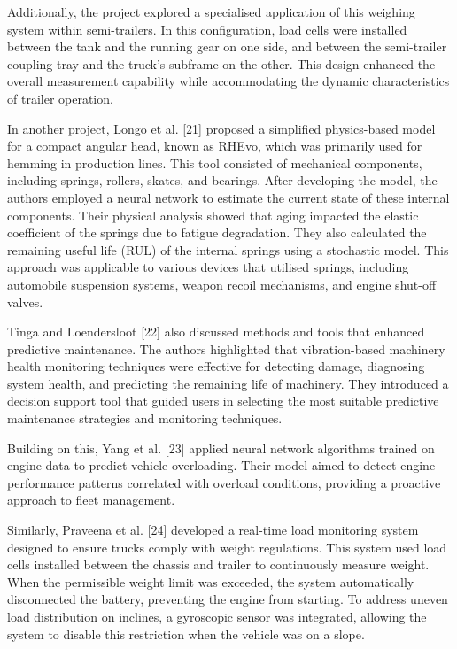 Additionally, the project explored a specialised application of this weighing system within semi-trailers. In this configuration, load cells were installed between the tank and the running gear on one side, and between the semi-trailer coupling tray and the truck's subframe on the other. This design enhanced the overall measurement capability while accommodating the dynamic characteristics of trailer operation.

In another project, Longo et al. [21] proposed a simplified physics-based model for a compact angular head, known as RHEvo, which was primarily used for hemming in production lines. This tool consisted of mechanical components, including springs, rollers, skates, and bearings. After developing the model, the authors employed a neural network to estimate the current state of these internal components. Their physical analysis showed that aging impacted the elastic coefficient of the springs due to fatigue degradation. They also calculated the remaining useful life (RUL) of the internal springs using a stochastic model. This approach was applicable to various devices that utilised springs, including automobile suspension systems, weapon recoil mechanisms, and engine shut-off valves.

Tinga and Loendersloot [22] also discussed methods and tools that enhanced predictive maintenance. The authors highlighted that vibration-based machinery health monitoring techniques were effective for detecting damage, diagnosing system health, and predicting the remaining life of machinery. They introduced a decision support tool that guided users in selecting the most suitable predictive maintenance strategies and monitoring techniques.

Building on this, Yang et al. [23] applied neural network algorithms trained on engine data to predict vehicle overloading. Their model aimed to detect engine performance patterns correlated with overload conditions, providing a proactive approach to fleet management.

Similarly, Praveena et al. [24] developed a real-time load monitoring system designed to ensure trucks comply with weight regulations. This system used load cells installed between the chassis and trailer to continuously measure weight. When the permissible weight limit was exceeded, the system automatically disconnected the battery, preventing the engine from starting. To address uneven load distribution on inclines, a gyroscopic sensor was integrated, allowing the system to disable this restriction when the vehicle was on a slope.

